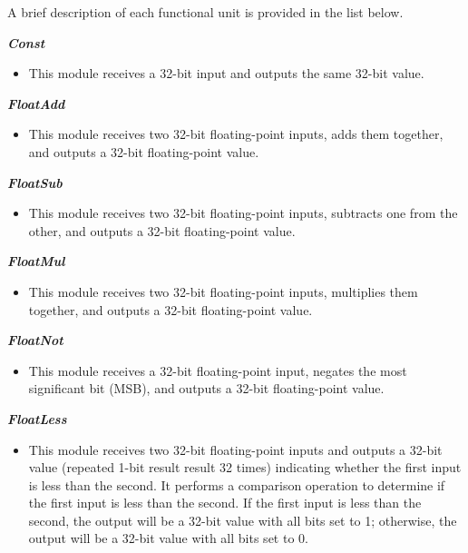 A brief description of each functional unit is provided in the list below.

\vspace{0.5cm}

\textbf{\textit{Const}}
\begin{itemize}
\item This module receives a 32-bit input and outputs the same 32-bit value.
\end{itemize}

\vspace{0.5cm}

\textbf{\textit{FloatAdd}}
\begin{itemize}
\item This module receives two 32-bit floating-point inputs, adds them together, and outputs a 32-bit floating-point value.
\end{itemize}

\vspace{0.5cm}

\textbf{\textit{FloatSub}}
\begin{itemize}
\item This module receives two 32-bit floating-point inputs, subtracts one from the other, and outputs a 32-bit floating-point value.
\end{itemize}

\vspace{0.5cm}

\textbf{\textit{FloatMul}}
\begin{itemize}
\item  This module receives two 32-bit floating-point inputs, multiplies them together, and outputs a 32-bit floating-point value.
\end{itemize}

\vspace{0.5cm}

\textbf{\textit{FloatNot}}
\begin{itemize}
\item  This module receives a 32-bit floating-point input, negates the most significant bit (MSB), and outputs a 32-bit floating-point value.
\end{itemize}

\vspace{0.5cm}

\textbf{\textit{FloatLess}}
\begin{itemize}
\item  This module receives two 32-bit floating-point inputs and outputs a 32-bit value (repeated 1-bit result result 32 times) indicating whether the first input is less than the second. It performs a comparison operation to determine if the first input is less than the second.
If the first input is less than the second, the output will be a 32-bit value with all bits set to 1; otherwise, the output will be a 32-bit value with all bits set to 0.
\end{itemize}

